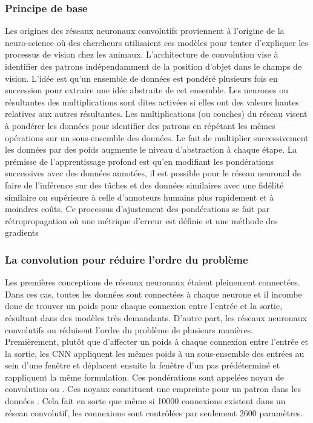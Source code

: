     \subsubsection{Principe de base}
    Les origines des réseaux neuronaux convolutifs proviennent à l'origine de la neuro-science où des chercheurs utilisaient ces modèles pour tenter d'expliquer les processus de vision \parencite{fukushima_neocognitron_1980} chez les animaux. L'architecture de convolution vise à identifier des patrons indépendamment de la position d'objet dans le champs de vision. L'idée est qu'un ensemble de données est pondéré plusieurs fois en succession pour extraire une idée abstraite de cet ensemble. Les neurones ou résultantes des multiplications sont dites activées si elles ont des valeurs hautes relatives aux autres résultantes. Les multiplications (ou couches) du réseau visent à pondérer les données pour identifier des patrons en répétant les mêmes opérations sur un sous-ensemble des données. Le fait de multiplier successivement les données par des poids augmente le niveau d'abstraction à chaque étape. La prémisse de l'apprentissage profond est qu'en modifiant les pondérations successives avec des données annotées, il est possible pour le réseau neuronal de faire de l'inférence sur des tâches et des données similaires avec une fidélité similaire ou supérieure à celle d'annoteurs humains plus rapidement et à moindres coûts. Ce processus d'ajustement des pondérations se fait par rétropropagation où une métrique d'erreur est définie et une méthode des gradients \parencite{rumelhart_learning_1986}\par
     \subsubsection{La convolution pour réduire l'ordre du problème}
    Les premières conceptions de réseaux neuronaux étaient pleinement connectées. Dans ces cas, toutes les données sont connectées à chaque neurone et il incombe donc de trouver un poids pour chaque connexion entre l'entrée et la sortie, résultant dans des modèles très demandants. D'autre part,  les réseaux neuronaux convolutifs ou \fg{} réduisent l'ordre du problème de plusieurs manières. Premièrement, plutôt que d'affecter un poids à chaque connexion entre l'entrée et la sortie, les \ac{CNN} appliquent les mêmes poids à un sous-ensemble des entrées au sein d'une fenêtre et déplacent ensuite la fenêtre d'un pas prédéterminé et rappliquent la même formulation. Ces pondérations sont appelées noyau de convolution ou  \fg. Ces noyaux constituent une empreinte pour un patron dans les données \parencite{lecun_convolutional_1995}. Cela fait en sorte que même si 10000 connexions existent dans un réseau convolutif, les connexions sont contrôlées par seulement 2600 paramètres.\par
